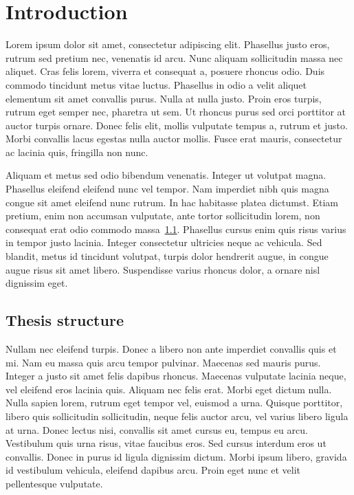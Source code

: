 \chapter{Introduction}
\label{section:introduction}

Lorem ipsum dolor sit amet, consectetur adipiscing elit. Phasellus justo eros, rutrum sed pretium nec, venenatis id arcu. Nunc aliquam sollicitudin massa nec aliquet. Cras felis lorem, viverra et consequat a, posuere rhoncus odio. Duis commodo tincidunt metus vitae luctus. Phasellus in odio a velit aliquet elementum sit amet convallis purus. Nulla at nulla justo. Proin eros turpis, rutrum eget semper nec, pharetra ut sem. Ut rhoncus purus sed orci porttitor at auctor turpis ornare. Donec felis elit, mollis vulputate tempus a, rutrum et justo. Morbi convallis lacus egestas nulla auctor mollis. Fusce erat mauris, consectetur ac lacinia quis, fringilla non nunc.

Aliquam et metus sed odio bibendum venenatis. Integer ut volutpat magna. Phasellus eleifend eleifend nunc vel tempor. Nam imperdiet nibh quis magna congue sit amet eleifend nunc rutrum. In hac habitasse platea dictumst. Etiam pretium, enim non accumsan vulputate, ante tortor sollicitudin lorem, non consequat erat odio commodo massa~\ref{section:introduction:structure}. Phasellus cursus enim quis risus varius in tempor justo lacinia. Integer consectetur ultricies neque ac vehicula. Sed blandit, metus id tincidunt volutpat, turpis dolor hendrerit augue, in congue augue risus sit amet libero. Suspendisse varius rhoncus dolor, a ornare nisl dignissim eget.

\section{Thesis structure}
\label{section:introduction:structure}

Nullam nec eleifend turpis. Donec a libero non ante imperdiet convallis quis et mi. Nam eu massa quis arcu tempor pulvinar. Maecenas sed mauris purus. Integer a justo sit amet felis dapibus rhoncus. Maecenas vulputate lacinia neque, vel eleifend eros lacinia quis. Aliquam nec felis erat. Morbi eget dictum nulla. Nulla sapien lorem, rutrum eget tempor vel, euismod a urna. Quisque porttitor, libero quis sollicitudin sollicitudin, neque felis auctor arcu, vel varius libero ligula at urna. Donec lectus nisi, convallis sit amet cursus eu, tempus eu arcu. Vestibulum quis urna risus, vitae faucibus eros. Sed cursus interdum eros ut convallis. Donec in purus id ligula dignissim dictum. Morbi ipsum libero, gravida id vestibulum vehicula, eleifend dapibus arcu. Proin eget nunc et velit pellentesque vulputate.

